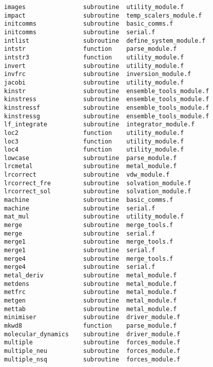 \begin{verbatim}
images                subroutine  utility_module.f          
impact                subroutine  temp_scalers_module.f     
initcomms             subroutine  basic_comms.f             
initcomms             subroutine  serial.f                  
intlist               subroutine  define_system_module.f    
intstr                function    parse_module.f            
intstr3               function    utility_module.f          
invert                subroutine  utility_module.f          
invfrc                subroutine  inversion_module.f        
jacobi                subroutine  utility_module.f          
kinstr                subroutine  ensemble_tools_module.f   
kinstress             subroutine  ensemble_tools_module.f   
kinstressf            subroutine  ensemble_tools_module.f   
kinstressg            subroutine  ensemble_tools_module.f   
lf_integrate          subroutine  integrator_module.f       
loc2                  function    utility_module.f          
loc3                  function    utility_module.f          
loc4                  function    utility_module.f          
lowcase               subroutine  parse_module.f            
lrcmetal              subroutine  metal_module.f            
lrcorrect             subroutine  vdw_module.f              
lrcorrect_fre         subroutine  solvation_module.f        
lrcorrect_sol         subroutine  solvation_module.f        
machine               subroutine  basic_comms.f             
machine               subroutine  serial.f                  
mat_mul               subroutine  utility_module.f          
merge                 subroutine  merge_tools.f             
merge                 subroutine  serial.f                  
merge1                subroutine  merge_tools.f             
merge1                subroutine  serial.f                  
merge4                subroutine  merge_tools.f             
merge4                subroutine  serial.f                  
metal_deriv           subroutine  metal_module.f            
metdens               subroutine  metal_module.f            
metfrc                subroutine  metal_module.f            
metgen                subroutine  metal_module.f            
mettab                subroutine  metal_module.f            
minimiser             subroutine  driver_module.f           
mkwd8                 function    parse_module.f            
molecular_dynamics    subroutine  driver_module.f           
multiple              subroutine  forces_module.f           
multiple_neu          subroutine  forces_module.f           
multiple_nsq          subroutine  forces_module.f           

\end{verbatim}
